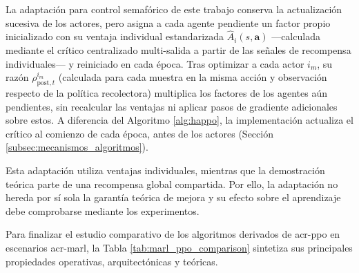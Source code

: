\begingroup
{}
La adaptación para control semafórico de este trabajo conserva la actualización sucesiva de los actores, pero asigna a cada agente pendiente un factor propio inicializado con su ventaja individual estandarizada $\hat{A}_i(s, \mathbf{a})$ —calculada mediante el crítico centralizado multi-salida a partir de las señales de recompensa individuales— y reiniciado en cada época. Tras optimizar a cada actor $i_m$, su razón $\rho_{\text{post},t}^{i_m}$ (calculada para cada muestra en la misma acción y observación respecto de la política recolectora) multiplica los factores de los agentes aún pendientes, sin recalcular las ventajas ni aplicar pasos de gradiente adicionales sobre estos. A diferencia del Algoritmo \ref{alg:happo}, la implementación actualiza el crítico al comienzo de cada época, antes de los actores (Sección \ref{subsec:mecanismos_algoritmos}).
\par
\endgroup

Esta adaptación utiliza ventajas individuales, mientras que la demostración teórica parte de una recompensa global compartida. Por ello, la adaptación no hereda por sí sola la garantía teórica de mejora y su efecto sobre el aprendizaje debe comprobarse mediante los experimentos.

Para finalizar el estudio comparativo de los algoritmos derivados de \acrshort{acr-ppo} en escenarios \acrshort{acr-marl}, la Tabla \ref{tab:marl_ppo_comparison} sintetiza sus principales propiedades operativas, arquitectónicas y teóricas.

